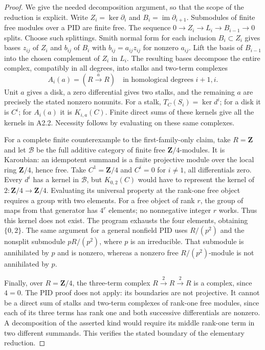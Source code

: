 \begin{proof}
We give the needed decomposition argument, so that the scope of the
reduction is explicit.  Write $Z_i=\ker\partial_i$ and
$B_i=\operatorname{im}\partial_{i+1}$.  Submodules of finite free modules
over a PID are finite free.  The sequence
$0\to Z_i\to L_i\to B_{i-1}\to0$ splits.  Choose such splittings.
Smith normal form for each inclusion $B_i\subset Z_i$ gives bases
$z_{ij}$ of $Z_i$ and $b_{ij}$ of $B_i$ with
$b_{ij}=a_{ij}z_{ij}$ for nonzero $a_{ij}$.  Lift the basis of
$B_{i-1}$ into the chosen complement of $Z_i$ in $L_i$.
The resulting bases decompose the entire complex, compatibly in all
degrees, into stalks and two-term complexes
\[
 A_i(a)=(R\xrightarrow{a}R)
       \quad\text{in homological degrees }i+1,i.
\]
Unit $a$ gives a disk, a zero differential gives two stalks, and the
remaining $a$ are precisely the stated nonzero nonunits.  For a stalk,
$T_C(S_i)=\ker d^i$; for a disk it is $C^i$; for $A_i(a)$ it is
$K_{i,a}(C)$.  Finite direct sums of these kernels give all the kernels
in A2.2.  Necessity follows by evaluating on these same complexes.

For a complete finite counterexample to the first-family-only claim,
take $R=\mathbf Z$ and let $\mathcal B$ be the full additive category
of finite free $\mathbf Z/4$-modules.  It is Karoubian: an idempotent
summand is a finite projective module over the local ring
$\mathbf Z/4$, hence free.  Take $C^1=\mathbf Z/4$ and $C^i=0$ for
$i\ne1$, all differentials zero.  Every $d^i$ has a kernel in
$\mathcal B$, but $K_{0,2}(C)$ would have to represent the kernel of
$2:\mathbf Z/4\to\mathbf Z/4$.  Evaluating its universal property at
the rank-one free object requires a group with two elements.  For a
free object of rank $r$, the group of maps from that generator has
$4^r$ elements; no nonnegative integer $r$ works.  Thus this kernel
does not exist.  The program exhausts the four elements, obtaining
$\{0,2\}$.  The same argument for a general nonfield PID uses
$R/(p^2)$ and the nonsplit submodule $pR/(p^2)$, where $p$ is an
irreducible.  That submodule is annihilated by $p$ and is nonzero,
whereas a nonzero free $R/(p^2)$-module is not annihilated by $p$.

Finally, over $R=\mathbf Z/4$, the three-term complex
$R\xrightarrow{2}R\xrightarrow{2}R$ is a complex, since $4=0$.
The PID proof does not apply: its boundaries are not projective.  It
cannot be a direct sum of stalks and two-term complexes of rank-one
free modules, since each of its three terms has rank one and both
successive differentials are nonzero.  A decomposition of the asserted
kind would require its middle rank-one term in two different summands.
This verifies the stated boundary of the elementary reduction.
\end{proof}

